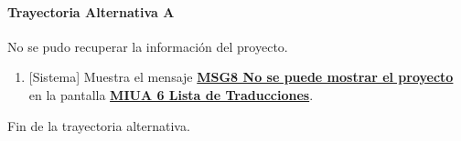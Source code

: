 \paragraph{Trayectoria Alternativa A} \label{A-PR-CU1.1:TA}
	No se pudo recuperar la información del proyecto.
	\begin{enumerate}[label=A\arabic*.]
		\item {[Sistema]} Muestra el mensaje \hyperref[MSG8]{\bf MSG8 No se puede mostrar el proyecto} en la pantalla \hyperref[fig:MIUA-6]{\bf MIUA 6 Lista de Traducciones}.
	\end{enumerate}
	Fin de la trayectoria alternativa.
